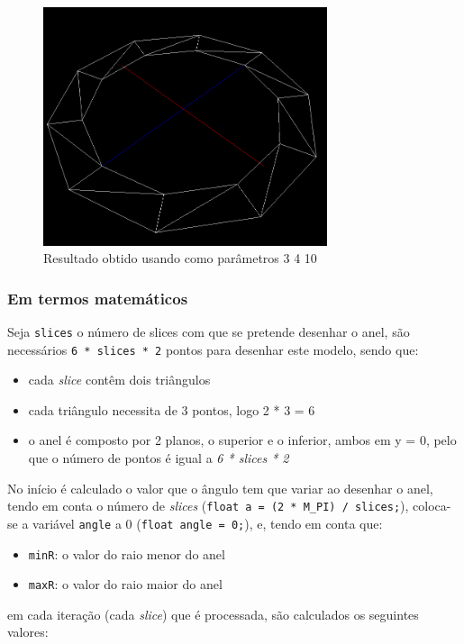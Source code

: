 \documentclass{article}
\begin{document}
\begin{figure}[H]
    \centering
    \includegraphics[height=7cm]{ring.png}
    \caption{Resultado obtido usando como parâmetros 3 4 10} 
\end{figure}

\subsubsection{Em termos matemáticos}
Seja \texttt{slices} o número de slices com que se pretende desenhar o anel, são necessários \texttt{6 * slices * 2} pontos para desenhar este modelo, sendo que:

\begin{itemize}
	\item cada \textit{slice} contêm dois triângulos
	\item cada triângulo necessita de 3 pontos, logo 2 * 3 = 6
	\item o anel é composto por 2 planos, o superior e o inferior, ambos em y = 0, pelo que o número de pontos é igual a \textit{6 * slices * 2}
\end{itemize}

No início é calculado o valor que o ângulo tem que variar ao desenhar o anel, tendo em conta o número de \textit{slices} (\texttt{float a = (2 * M\_PI) / slices;}), coloca-se a variável \texttt{angle} a 0 (\texttt{float angle = 0;}), e, tendo em conta que:

\begin{itemize}
	\item \texttt{minR}: o valor do raio menor do anel
	\item \texttt{maxR}: o valor do raio maior do anel
\end{itemize}

em cada iteração (cada \textit{slice}) que é processada, são calculados os seguintes valores:
\end{document}
